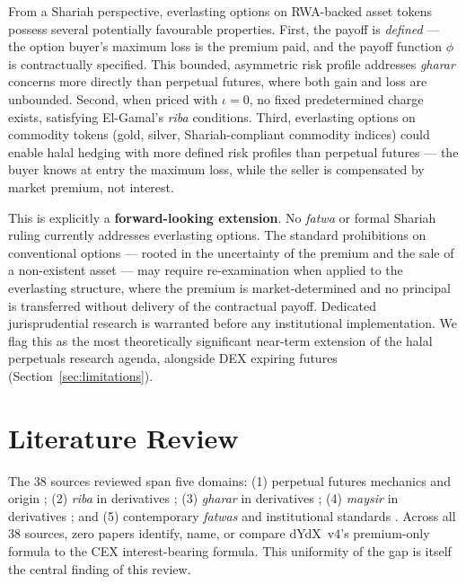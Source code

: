 \documentclass[10pt,twocolumn]{article}
\begin{document}
From a Shariah perspective, everlasting options on RWA-backed asset tokens
possess several potentially favourable properties. First, the payoff is
\emph{defined} --- the option buyer's maximum loss is the premium paid, and the
payoff function $\phi$ is contractually specified. This bounded, asymmetric
risk profile addresses \textit{gharar} concerns more directly than perpetual
futures, where both gain and loss are unbounded. Second, when priced with
$\iota = 0$, no fixed predetermined charge exists, satisfying El-Gamal's
\textit{riba} conditions. Third, everlasting options on commodity tokens
(gold, silver, Shariah-compliant commodity indices) could enable halal hedging
with more defined risk profiles than perpetual futures --- the buyer knows at
entry the maximum loss, while the seller is compensated by market premium, not
interest.

This is explicitly a \textbf{forward-looking extension}. No \textit{fatwa} or
formal Shariah ruling currently addresses everlasting options. The standard
prohibitions on conventional options --- rooted in the uncertainty of the
premium and the sale of a non-existent asset --- may require re-examination when
applied to the everlasting structure, where the premium is market-determined and
no principal is transferred without delivery of the contractual payoff. Dedicated
jurisprudential research is warranted before any institutional implementation.
We flag this as the most theoretically significant near-term extension of the
halal perpetuals research agenda, alongside DEX expiring futures
(Section~\ref{sec:limitations}).

\section{Literature Review}
\label{sec:lit}

The 38 sources reviewed span five domains: (1) perpetual futures mechanics and
origin \cite{Hayes2016,Shiller1993,Ackerer2024}; (2) \textit{riba} in
derivatives \cite{ElGamal2006,Kamali2000,Ayub2007,Jobst2007,SoleJobst2012,
Malkawi2014,Tashfeen2022,Uluyol2024}; (3) \textit{gharar} in derivatives
\cite{ElGamal2001,Alias2015,Elhessi2018,Kasri2016,AliasOthman2024}; (4)
\textit{maysir} in derivatives \cite{Salamon2015,Alias2021,Alias2023,
Obaidullah2005}; and (5) contemporary \textit{fatwas} and institutional
standards \cite{Musaffa2024,IslamQA2023,SeekersGuidance2025,PracticalIF2023,
AAOIFI2015,DSNMUI2021,Amin2024,Indonesian2024}.
Across all 38 sources, zero papers identify, name, or compare dYdX~v4's
premium-only formula to the CEX interest-bearing formula.
This uniformity of the gap is itself the central finding of this review.
\end{document}
